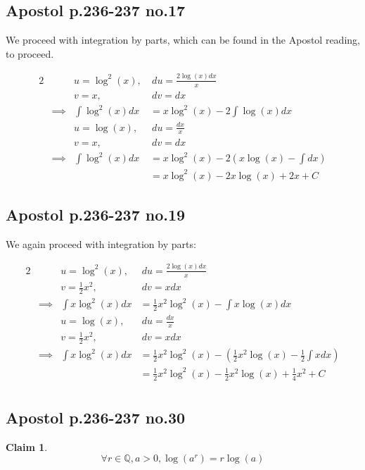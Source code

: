 \documentclass[12pt,letterpaper]{article}
\theoremstyle{definition}
\newtheorem*{claim}{Claim}
\newcommand{\Q}{\mathbb{Q}}
\begin{document}
\subsection*{Apostol p.236-237 no.17}

We proceed with integration by parts, which can be found in the Apostol reading,
to proceed.

\begin{alignat*}{2}
  &&u = \log^2(x),&\ du = \frac{2\log(x) dx}{x} \\
  &&v = x, &\ dv = dx \\
  &\implies& \int \log^2(x)dx &= x\log^2(x) - 2\int \log(x)dx \\
  &&u = \log(x), &\ du = \frac{dx}{x} \\
  &&v = x, &\ dv = dx \\
  &\implies& \int \log^2(x)dx &= x\log^2(x) - 2(x\log(x) - \int dx) \\
  && &= x\log^2(x) - 2x\log(x) + 2x + C
\end{alignat*}

\subsection*{Apostol p.236-237 no.19}

We again proceed with integration by parts:

\begin{alignat*}{2}
  &&u = \log^2(x), &\ du = \frac{2\log(x)dx}{x} \\
  &&v = \frac{1}{2}x^2, &\ dv = xdx \\
  &\implies& \int x\log^2(x)dx &= \frac{1}{2}x^2\log^2(x) - \int x\log(x)dx \\
  &&u = \log(x), &\ du = \frac{dx}{x} \\
  &&v = \frac{1}{2}x^2, &\ dv = xdx \\
  &\implies& \int x\log^2(x)dx &= \frac{1}{2}x^2\log^2(x) -
  (\frac{1}{2}x^2\log(x) - \frac{1}{2}\int xdx) \\
  && &= \frac{1}{2}x^2\log^2(x) - \frac{1}{2}x^2\log(x) + \frac{1}{4}x^2 + C \\
\end{alignat*}

\subsection*{Apostol p.236-237 no.30}

\begin{claim}
  \[ \forall r \in \Q, a > 0, \log(a^r) = r\log(a) \]
\end{claim}
\end{document}
